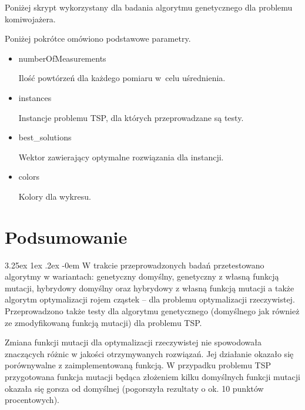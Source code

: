 \documentclass[11pt, a4paper]{article}
\makeatletter
\newcommand{\fbi}{\leavevmode{\parindent=1em\indent}}
\renewcommand\paragraph{\@startsection{paragraph}{5}{\z@}
  {3.25ex \@plus1ex \@minus.2ex}
  {-0em}
  {\normalfont\normalsize\bfseries}}
\makeatother
\begin{document}
\fbi
Poniżej skrypt wykorzystany dla badania algorytmu genetycznego dla problemu komiwojażera.



Poniżej pokrótce omówiono podstawowe parametry.

\begin{itemize}
	\item numberOfMeasurements
	
	Ilość powtórzeń dla każdego pomiaru w~celu uśrednienia.
	
	\item instances
	
	Instancje problemu TSP, dla których przeprowadzane są testy.
	
	\item best\_solutions
	
	Wektor zawierający optymalne rozwiązania dla instancji.
	
	\item colors
	
	Kolory dla wykresu.
	
\end{itemize}

\newpage
\section{Podsumowanie}
\paragraph{}
W trakcie przeprowadzonych badań przetestowano algorytmy w wariantach: genetyczny domyślny, genetyczny z własną funkcją mutacji, hybrydowy domyślny oraz hybrydowy z własną funkcją mutacji a także algorytm optymalizacji rojem cząstek -- dla problemu optymalizacji rzeczywistej. Przeprowadzono także testy dla algorytmu genetycznego (domyślnego jak również ze zmodyfikowaną funkcją mutacji) dla problemu TSP.

\fbi
Zmiana funkcji mutacji dla optymalizacji rzeczywistej nie spowodowała znaczących różnic w jakości otrzymywanych rozwiązań. Jej działanie okazało się porównywalne z zaimplementowaną funkcją. W przypadku problemu TSP przygotowana funkcja mutacji będąca złożeniem kilku domyślnych funkcji mutacji okazała się gorsza od domyślnej (pogorszyła rezultaty o ok. 10 punktów procentowych).
\end{document}
